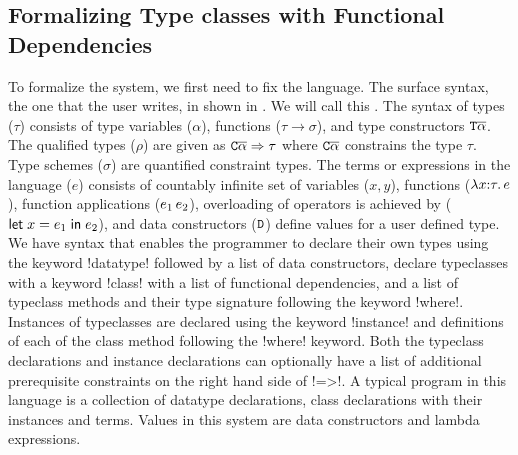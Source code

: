 \documentclass[format=sigplan,manuscript,review,screen,nonacm,margin=1in]{acmart}
\begin{document}
\subsection{Formalizing Type classes with Functional Dependencies}\label{subsec:tc-formal}
To formalize the system, we first need to fix the language.
The surface syntax, the one that the user writes, in shown in .
We will call this \TCFD{}.
The syntax of types ($\tau$) consists of  type variables ($\alpha$),
functions ($\tau\to\sigma$), and type constructors $\texttt{T}\overline{\alpha}$.
The qualified types ($\rho$) are given as $\texttt{C}\overline{\alpha}\Rightarrow\tau$
where $\texttt{C}\overline{\alpha}$ constrains the type $\tau$. Type schemes ($\sigma$) are quantified constraint types.
The terms or expressions in the language ($e$) consists of countably
infinite set of variables ($x, y$), functions ($\lambda x{:}\tau.\, e$),
function applications ($e_1\, e_2$), overloading of operators is achieved by ($\mathsf{let}\;x = e_1\;\mathsf{in}\;e_2$), and
data constructors ($\texttt{D}$) define values for a user defined type.
We have syntax that enables the programmer to declare their own types using the keyword !datatype!
followed by a list of data constructors, declare typeclasses with a keyword !class! with a list
of functional dependencies, and a list of typeclass methods and their type signature
following the keyword !where!. Instances of typeclasses are declared using
the keyword !instance! and definitions of each of the class method following the !where! keyword.
Both the typeclass declarations and instance declarations can optionally have a list of
additional prerequisite constraints on the right hand side of !=>!.
A typical program in this language is a collection of datatype declarations,
class declarations with their instances and terms. Values in this system are data constructors and lambda expressions.
\end{document}
